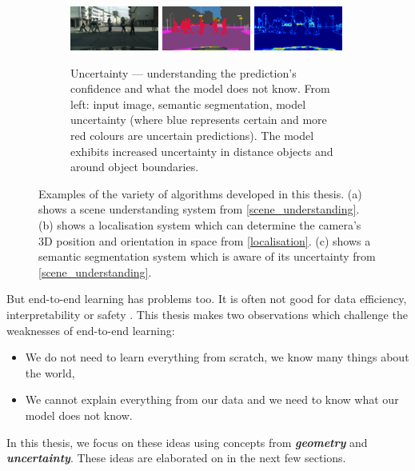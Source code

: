 \begin{figure}[t]
    
    \begin{subfigure}[b]{\textwidth}
\centering
        \includegraphics[width=0.32\textwidth,trim={0 20mm 0 0},clip]{Chapter2/Figs/results/segnet_107_output_0.jpg}
        \includegraphics[width=0.32\textwidth,trim={0 20mm 0 0},clip]{Chapter2/Figs/results/segnet_107_output_1.png}
        \includegraphics[width=0.32\textwidth,trim={0 20mm 0 0},clip]{Chapter2/Figs/results/segnet_107_output_2.png}
        \caption{Uncertainty --- understanding the prediction's confidence and what the model does not know. From left: input image, semantic segmentation, model uncertainty (where blue represents certain and more red colours are uncertain predictions). The model exhibits increased uncertainty in distance objects and around object boundaries.}
    \end{subfigure}
\caption[Examples of algorithms in this thesis.]{Examples of the variety of algorithms developed in this thesis. (a) shows a scene understanding system from \cref{scene_understanding}. (b) shows a localisation system which can determine the camera's 3D position and orientation in space from \cref{localisation}. (c) shows a semantic segmentation system which is aware of its uncertainty from \cref{scene_understanding}.}
\label{ch1:teaser}
\end{figure}

But end-to-end learning has problems too. It is often not good for data efficiency, interpretability or safety \citep{mcallister2017av_bdl}. This thesis makes two observations which challenge the weaknesses of end-to-end learning:
\begin{itemize}
\item We do not need to learn everything from scratch, we know many things about the world,
\item We cannot explain everything from our data and we need to know what our model does not know.
\end{itemize}
In this thesis, we focus on these ideas using concepts from \textbf{\textit{geometry}} and \textbf{\textit{uncertainty}}. These ideas are elaborated on in the next few sections.


